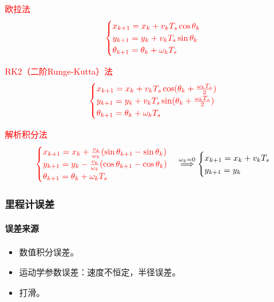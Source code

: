 \documentclass[
12pt, %
a4paper, 
oneside, %
]{scrartcl}
\begin{document}
\begin{itemize}
\begin{minipage}{0.5\textwidth}
\item \textcolor{red}{欧拉法}
$$ \textcolor{red}{\begin{cases} x_{k + 1} = x_k + v_k T_s \cos \theta_k \\ y_{k + 1} = y_k + v_k T_s \sin \theta_k \\ \theta_{k + 1} = \theta_k + \omega_k T_s \end{cases}} $$
\end{minipage}
\begin{minipage}{0.5\textwidth}
\item \textcolor{red}{RK2（二阶Runge-Kutta）法}
$$ \textcolor{red}{\begin{cases} x_{k + 1} = x_k + v_k T_s \cos(\theta_k + \frac{\omega_k T_s}{2}) \\ y_{k + 1} = y_k + v_k T_s \sin(\theta_k + \frac{\omega_k T_s}{2}) \\ \theta_{k + 1} = \theta_k + \omega_k T_s \end{cases}} $$
\end{minipage}
\item \textcolor{red}{解析积分法}
$$ \textcolor{red}{\begin{cases} x_{k + 1} = x_k + \frac{v_k}{\omega_k} (\sin \theta_{k + 1} - \sin \theta_k) \\ y_{k + 1} = y_k - \frac{v_k}{\omega_k} (\cos \theta_{k + 1} - \cos \theta_k) \\ \theta_{k + 1} = \theta_k + \omega_k T_s \end{cases}} \overset{\omega_k = 0}{\Longrightarrow} \begin{cases} x_{k + 1} = x_k + v_k T_s \\ y_{k + 1} = y_k \end{cases} $$
\end{itemize}
\subsubsection[里程计误差]{里程计误差}
\paragraph{误差来源}
\begin{itemize}
\item 数值积分误差。
\item 运动学参数误差：速度不恒定，半径误差。
\item 打滑。
\end{itemize}
\end{document}
